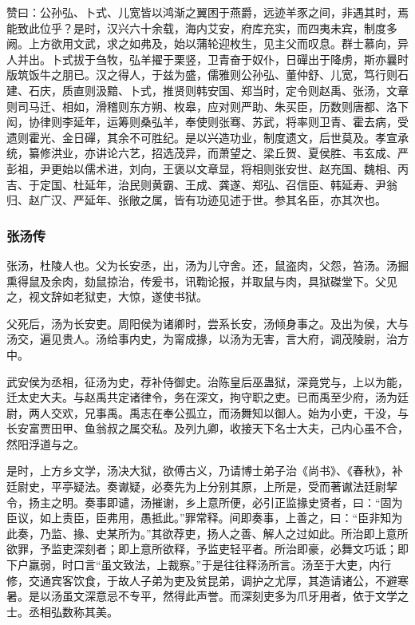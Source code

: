 \documentclass[]{article}
\begin{document}
赞曰：公孙弘、卜式、儿宽皆以鸿渐之翼困于燕爵，远迹羊豕之间，非遇其时，焉能致此位乎？是时，汉兴六十余载，海内艾安，府库充实，而四夷未宾，制度多阙。上方欲用文武，求之如弗及，始以蒲轮迎枚生，见主父而叹息。群士慕向，异人并出。卜式拔于刍牧，弘羊擢于栗竖，卫青奋于奴仆，日磾出于降虏，斯亦曩时版筑饭牛之朋已。汉之得人，于兹为盛，儒雅则公孙弘、董仲舒、儿宽，笃行则石建、石庆，质直则汲黯、卜式，推贤则韩安国、郑当时，定令则赵禹、张汤，文章则司马迁、相如，滑稽则东方朔、枚皋，应对则严助、朱买臣，历数则唐都、洛下闳，协律则李延年，运筹则桑弘羊，奉使则张骞、苏武，将率则卫青、霍去病，受遗则霍光、金日磾，其余不可胜纪。是以兴造功业，制度遗文，后世莫及。孝宣承统，纂修洪业，亦讲论六艺，招选茂异，而萧望之、梁丘贺、夏侯胜、韦玄成、严彭祖，尹更始以儒术进，刘向，王褒以文章显，将相则张安世、赵充国、魏相、丙吉、于定国、杜延年，治民则黄霸、王成、龚遂、郑弘、召信臣、韩延寿、尹翁归、赵广汉、严延年、张敞之属，皆有功迹见述于世。参其名臣，亦其次也。

\hypertarget{header-n4656}{%
\subsubsection{张汤传}\label{header-n4656}}

张汤，杜陵人也。父为长安丞，出，汤为儿守舍。还，鼠盗肉，父怨，笞汤。汤掘熏得鼠及余肉，劾鼠掠治，传爰书，讯鞫论报，并取鼠与肉，具狱磔堂下。父见之，视文辞如老狱吏，大惊，遂使书狱。

父死后，汤为长安吏。周阳侯为诸卿时，尝系长安，汤倾身事之。及出为侯，大与汤交，遍见贵人。汤给事内史，为甯成掾，以汤为无害，言大府，调茂陵尉，治方中。

武安侯为丞相，征汤为史，荐补侍御史。治陈皇后巫蛊狱，深竟党与，上以为能，迁太史大夫。与赵禹共定诸律令，务在深文，拘守职之吏。已而禹至少府，汤为廷尉，两人交欢，兄事禹。禹志在奉公孤立，而汤舞知以御人。始为小吏，干没，与长安富贾田甲、鱼翁叔之属交私。及列九卿，收接天下名士大夫，己内心虽不合，然阳浮道与之。

是时，上方乡文学，汤决大狱，欲傅古义，乃请博士弟子治《尚书》、《春秋》，补廷尉史，平亭疑法。奏谳疑，必奏先为上分别其原，上所是，受而著谳法廷尉挈令，扬主之明。奏事即谴，汤摧谢，乡上意所便，必引正监掾史贤者，曰：``固为臣议，如上责臣，臣弗用，愚抵此。''罪常释。间即奏事，上善之，曰：``臣非知为此奏，乃监、掾、史某所为。''其欲荐吏，扬人之善、解人之过如此。所治即上意所欲罪，予监吏深刻者；即上意所欲释，予监吏轻平者。所治即豪，必舞文巧诋；即下户羸弱，时口言``虽文致法，上裁察。''于是往往释汤所言。汤至于大吏，内行修，交通宾客饮食，于故人子弟为吏及贫昆弟，调护之尤厚，其造请诸公，不避寒暑。是以汤虽文深意忌不专平，然得此声誉。而深刻吏多为爪牙用者，依于文学之士。丞相弘数称其美。
\end{document}
